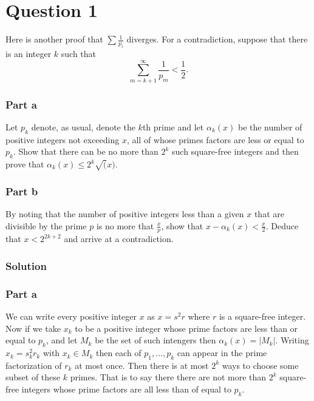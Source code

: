 \documentclass{unswmaths}
\begin{document}
\setlength\parindent{0pt}

\fancyfoot[r]{\today}

\section*{Question 1}
Here is another proof that $ \sum \frac{1}{p_i} $ diverges.
For a contradiction, suppose that there is an integer $ k $ such that 
$$
	\sum_{m = k + 1}^\infty \frac{1}{p_m} < \frac{1}{2}.
$$
\subsubsection*{Part a}
Let $ p_k$ denote, as usual, denote the $ k$th  prime and let $ \alpha_k(x) $ be the number of positive integers not exceeding $ x $,
all of whose primes factors are less or equal to $ p_k $. Show that there can be no more than $2^k $ such square-free integers and then prove that $ \alpha_k(x) \leq 2^k\sqrt(x) $.
\subsubsection*{Part b}
By noting that the number of positive integers less than a given $ x $ that are divisible by the prime $ p $ is no more that $ \frac{x}{p} $, show that $ x-\alpha_k(x) < \frac{x}{2} $.
Deduce that $ x < 2^{2k + 2 } $ and arrive at a contradiction.
\subsubsection*{Solution}
\subsubsection*{Part a}
We can write every positive integer $ x $ as $ x = s^2 r $ where $ r $ is a square-free integer.  Now if we take $ x_k $ to be a positive integer whose prime factors are less than or equal
to $ p_k $, and let $ M_k $ be the set of such intengers then $ \alpha_k(x) = |M_k| $.  Writing $x_k = s_k^2 r_k $ with $ x_k \in M_k $ then each of $ p_1, \ldots, p_k $ can appear in the
 prime factorization of $ r_k $ at most once. Then there is at most $ 2^k $ ways to choose some subset of these $ k $ primes.
That is to say there there are not more than $ 2^k $ square-free integers whose prime factors are all less than of equal to $ p_k $. 
\end{document}
